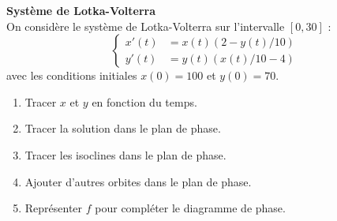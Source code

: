\documentclass[12pt]{article}
\begin{document}
\begin{exo}\textbf{Syst\`eme de Lotka-Volterra}\\
On consid\`ere le syst\`eme de Lotka-Volterra sur l'intervalle $[0,30]$ :
$$
\left\{
\begin{array}{rl}
x'(t)&=x(t)(2-y(t)/10)\\
y'(t)&=y(t)(x(t)/10-4)
\end{array}
\right.
$$
avec les conditions initiales $x(0)=100$ et $y(0)=70$.
\begin{enumerate}
\item Tracer $x$ et $y$ en fonction du temps.
\item Tracer la solution dans le plan de phase.
\item Tracer les isoclines dans le plan de phase. 
\item Ajouter d'autres orbites dans le plan de phase.
\item Repr\'esenter $f$ pour compl\'eter le diagramme de phase.
\end{enumerate}
\end{exo}
\end{document}
